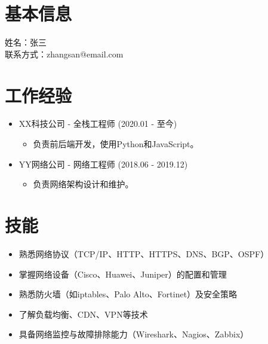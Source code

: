 \documentclass{article}
\begin{document}
\section*{基本信息}
姓名：张三 \\
联系方式：zhangsan@email.com

\section*{工作经验}
\begin{itemize}
  
  \item XX科技公司 - 全栈工程师 (2020.01 - 至今)
  \begin{itemize}
    \item 负责前后端开发，使用Python和JavaScript。
  \end{itemize}
  
  \item YY网络公司 - 网络工程师 (2018.06 - 2019.12)
  \begin{itemize}
    \item 负责网络架构设计和维护。
  \end{itemize}
  
\end{itemize}

\section*{技能}
\begin{itemize}
  
  \item 熟悉网络协议（TCP/IP、HTTP、HTTPS、DNS、BGP、OSPF）
  
  \item 掌握网络设备（Cisco、Huawei、Juniper）的配置和管理
  
  \item 熟悉防火墙（如iptables、Palo Alto、Fortinet）及安全策略
  
  \item 了解负载均衡、CDN、VPN等技术
  
  \item 具备网络监控与故障排除能力（Wireshark、Nagios、Zabbix）
  
\end{itemize}
\end{document}
